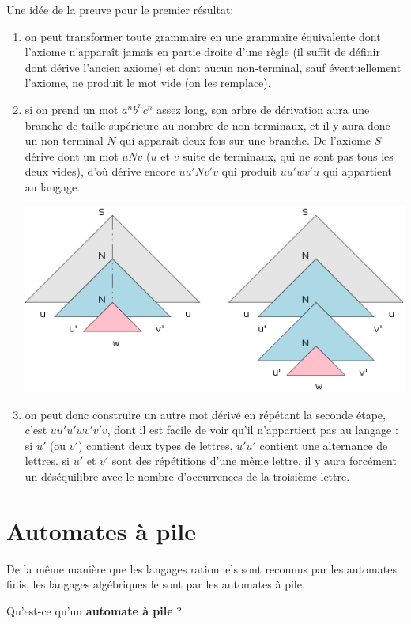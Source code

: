 \documentclass[10pt,twoside]{article}
\begin{document}
Une idée de la preuve pour le premier résultat: 
\begin{enumerate}
\item on peut transformer toute grammaire en une grammaire équivalente
dont l'axiome n'apparaît jamais en partie droite d'une règle (il suffit
de définir dont dérive l'ancien axiome)
et dont aucun non-terminal, sauf éventuellement l'axiome, ne produit le mot vide 
(on les remplace).
\item si on prend un mot $a^n b^n c^n$ assez long, son arbre de dérivation
aura une branche de taille supérieure au nombre de non-terminaux, et  
il y aura donc un non-terminal $N$ qui apparaît deux fois sur une branche.
De l'axiome $S$ dérive dont un mot $uNv$ ($u$ et $v$ suite de terminaux, 
qui ne sont pas tous les deux vides), 
d'où dérive encore $u u' N v' v$ qui produit $u u' w v' u$ qui 
appartient au langage.
\begin{center}
\includegraphics[width=.8\linewidth]{../dia/anbncn}
\end{center}
\item  on peut donc construire un autre mot dérivé en répétant la seconde
étape, c'est $u u' u'  w v' v' v$, dont il est facile de voir 
qu'il n'appartient pas au langage : si $u'$ (ou $v'$) contient deux types de lettres,
$u'u'$ contient une alternance de lettres. si $u'$ et $v'$ sont
des répétitions d'une même lettre, il y aura forcément un 
déséquilibre avec le nombre d'occurrences de la troisième lettre.

\end{enumerate}

\section{Automates à pile}

De la même manière que les langages rationnels sont reconnus par les
automates finis, les langages algébriques le sont par les automates 
à pile.

Qu'est-ce qu'un \textbf{automate à pile} ?
\end{document}
